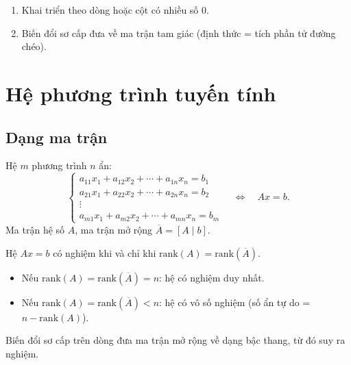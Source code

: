 \documentclass[12pt,a4paper]{article}
\begin{document}
\begin{phuongphap}[title={Tính định thức}]
  \begin{enumerate}
    \item Khai triển theo dòng hoặc cột có nhiều số 0.
    \item Biến đổi sơ cấp đưa về ma trận tam giác (định thức = tích phần tử đường chéo).
  \end{enumerate}
\end{phuongphap}

\section{Hệ phương trình tuyến tính}

\subsection{Dạng ma trận}

\begin{dinhnghia}
  Hệ $m$ phương trình $n$ ẩn:
  \[
    \begin{cases}
      a_{11}x_1 + a_{12}x_2 + \cdots + a_{1n}x_n = b_1 \\
      a_{21}x_1 + a_{22}x_2 + \cdots + a_{2n}x_n = b_2 \\
      \vdots \\
      a_{m1}x_1 + a_{m2}x_2 + \cdots + a_{mn}x_n = b_m
    \end{cases}
    \quad \Leftrightarrow \quad Ax = b.
  \]
  Ma trận hệ số $A$, ma trận mở rộng $\overline{A} = [A \mid b]$.
\end{dinhnghia}

\begin{dinhly}[title={Định lý Kronecker--Capelli}]
  Hệ $Ax = b$ có nghiệm khi và chỉ khi $\mathrm{rank}(A) = \mathrm{rank}(\overline{A})$.
  \begin{itemize}
    \item Nếu $\mathrm{rank}(A) = \mathrm{rank}(\overline{A}) = n$: hệ có nghiệm duy nhất.
    \item Nếu $\mathrm{rank}(A) = \mathrm{rank}(\overline{A}) < n$: hệ có vô số nghiệm (số ẩn tự do = $n - \mathrm{rank}(A)$).
  \end{itemize}
\end{dinhly}

\begin{phuongphap}[title={Phương pháp Gauss}]
  Biến đổi sơ cấp trên dòng đưa ma trận mở rộng về dạng bậc thang, từ đó suy ra nghiệm.
\end{phuongphap}
\end{document}
